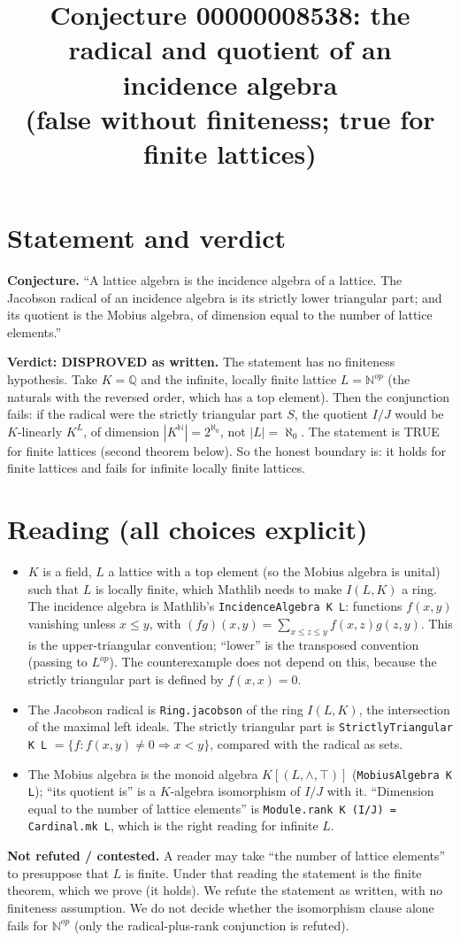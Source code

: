 \documentclass[11pt]{article}
\title{Conjecture 00000008538: the radical and quotient of an incidence algebra \\ (false without finiteness; true for finite lattices)}
\date{}
\begin{document}
\maketitle

\section*{Statement and verdict}
\textbf{Conjecture.} ``A lattice algebra is the incidence algebra of a lattice. The Jacobson radical of an
incidence algebra is its strictly lower triangular part; and its quotient is the Mobius algebra, of dimension
equal to the number of lattice elements.''

\textbf{Verdict: DISPROVED as written.} The statement has no finiteness hypothesis. Take $K=\mathbb Q$ and the infinite,
locally finite lattice $L=\mathbb N^{op}$ (the naturals with the reversed order, which has a top element). Then
the conjunction fails: if the radical were the strictly triangular part $S$, the quotient $I/J$ would be $K$-linearly $K^L$, of
dimension $|K^{\mathbb N}|=2^{\aleph_0}$, not $|L|=\aleph_0$. The statement is TRUE for finite lattices (second theorem below).
So the honest boundary is: it holds for finite lattices and fails for infinite locally finite lattices.

\section*{Reading (all choices explicit)}
\begin{itemize}
\item $K$ is a field, $L$ a lattice with a top element (so the Mobius algebra is unital) such that $L$ is locally finite,
which Mathlib needs to make $I(L,K)$ a ring. The incidence algebra is Mathlib's \texttt{IncidenceAlgebra K L}: functions $f(x,y)$ vanishing unless
$x\le y$, with $(fg)(x,y)=\sum_{x\le z\le y}f(x,z)g(z,y)$. This is the upper-triangular convention; ``lower'' is the transposed
convention (passing to $L^{op}$). The counterexample does not depend on this, because the strictly triangular part is defined by $f(x,x)=0$.
\item The Jacobson radical is \texttt{Ring.jacobson} of the ring $I(L,K)$, the intersection of the maximal left ideals. The strictly triangular part is
\texttt{StrictlyTriangular K L} $=\{f: f(x,y)\neq 0\Rightarrow x<y\}$, compared with the radical as sets.
\item The Mobius algebra is the monoid algebra $K[(L,\wedge,\top)]$ (\texttt{MobiusAlgebra K L}); ``its quotient is'' is a $K$-algebra isomorphism of $I/J$ with it.
``Dimension equal to the number of lattice elements'' is \texttt{Module.rank K (I/J) = Cardinal.mk L}, which is the right reading for infinite $L$.
\end{itemize}
\textbf{Not refuted / contested.} A reader may take ``the number of lattice elements'' to presuppose that $L$ is finite. Under that reading the
statement is the finite theorem, which we prove (it holds). We refute the statement as written, with no finiteness assumption. We do not decide
whether the isomorphism clause alone fails for $\mathbb N^{op}$ (only the radical-plus-rank conjunction is refuted).
\end{document}
